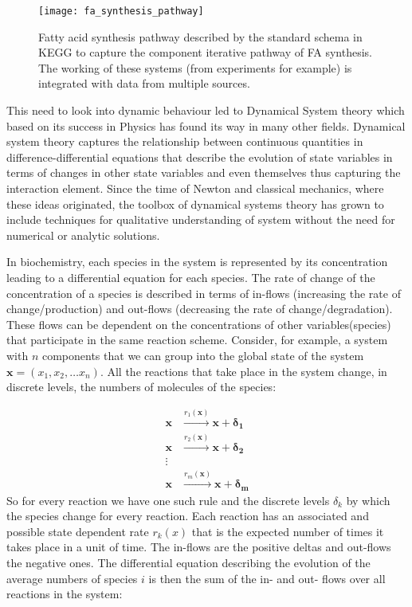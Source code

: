 \begin{figure}[htbp!]
\centering
\texttt{[image: fa\_synthesis\_pathway]}
\caption[Fatty Acid synthesis pathway]{Fatty acid synthesis pathway
  described by the standard schema in KEGG to capture the component
  iterative pathway of FA synthesis. The working of these
  systems (from experiments for example) is
  integrated with data from multiple sources.}
\label{fig:fa_synthesis_pathway}
\end{figure}

This need to look into dynamic behaviour led to Dynamical System
theory which based on its success in Physics has found its way in many
other fields. Dynamical system theory captures the relationship
between continuous quantities in difference-differential equations
that describe the evolution of state variables in terms of changes
in other state variables and even themselves thus capturing the
interaction element. Since the time of Newton and classical mechanics,
where these ideas originated, the toolbox of dynamical systems theory
has grown to include techniques for qualitative understanding of
system without the need for numerical or analytic solutions.

In biochemistry, each species in the system is represented by its
concentration leading to a differential equation for each species. The
rate of change of the concentration of a species is described in terms
of in-flows (increasing the rate of change/production) and out-flows
(decreasing the rate of change/degradation). These flows can be
dependent on the concentrations of other variables(species) that
participate in the same reaction scheme. Consider, for example, a
system with $n$ components that we can group into the global state of
the system $\mathbf{x} = (x_1, x_2, \dots x_n)$. All the reactions
that take place in the system change, in discrete levels, the numbers
of molecules of the species:

\begin{align*}
\mathbf{x} &\overset{r_1(\mathbf{x})}{\longrightarrow} \mathbf{x} +
\mathbf{\delta_1}\\
\mathbf{x} &\overset{r_2(\mathbf{x})}{\longrightarrow} \mathbf{x} +
\mathbf{\delta_2}\\
\vdots \\
\mathbf{x} &\overset{r_m(\mathbf{x})}{\longrightarrow} \mathbf{x} +
\mathbf{\delta_m}
\end{align*}
So for every reaction we have one such rule and the
discrete levels $\delta_k$ by which the species change for every reaction. Each
reaction has an associated and possible state dependent rate $r_k(x)$
that is the expected number of times it takes place in a
unit of time. The in-flows are the positive deltas and out-flows the negative
ones. The differential equation describing the evolution of the average numbers
of  species $i$ is then the sum of the in- and out- flows
over all reactions in the system:

